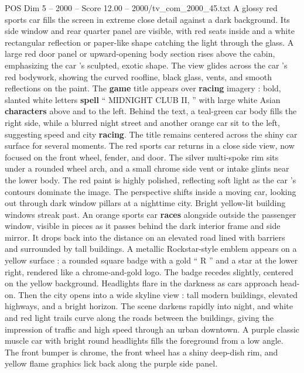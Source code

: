 \begin{textsample}{POS Dim 5 – 2000 – Score 12.00 – 2000/tv\_com\_2000\_45.txt}  \label{ex:f5_pos_022}
A glossy red sports car fills the screen in extreme close detail against a dark background.
Its side window and rear quarter panel are visible, with red seats inside and a white rectangular reflection or paper-like shape catching the light through the glass.
A large red door panel or upward-opening body section rises above the cabin, emphasizing the car ’s sculpted, exotic shape.
The view glides across the car ’s red bodywork, showing the curved roofline, black glass, vents, and smooth reflections on the paint.
The \textbf{game} title appears over \textbf{racing} imagery : bold, slanted white letters \textbf{spell} “ MIDNIGHT CLUB II, ” with large white Asian \textbf{characters} above and to the left.
Behind the text, a teal-green car body fills the right side, while a blurred night street and another orange car sit to the left, suggesting speed and city \textbf{racing}.
The title remains centered across the shiny car surface for several moments.
The red sports car returns in a close side view, now focused on the front wheel, fender, and door.
The silver multi-spoke rim sits under a rounded wheel arch, and a small chrome side vent or intake glints near the lower body.
The red paint is highly polished, reflecting soft light as the car ’s contours dominate the image.
The perspective shifts inside a moving car, looking out through dark window pillars at a nighttime city.
Bright yellow-lit building windows streak past.
An orange sports car \textbf{races} alongside outside the passenger window, visible in pieces as it passes behind the dark interior frame and side mirror.
It drops back into the distance on an elevated road lined with barriers and surrounded by tall buildings.
A metallic Rockstar-style emblem appears on a yellow surface : a rounded square badge with a gold “ R ” and a star at the lower right, rendered like a chrome-and-gold logo.
The badge recedes slightly, centered on the yellow background.
Headlights flare in the darkness as cars approach head-on.
Then the city opens into a wide skyline view : tall modern buildings, elevated highways, and a bright horizon.
The scene darkens rapidly into night, and white and red light trails curve along the roads between the buildings, giving the impression of traffic and high speed through an urban downtown.
A purple classic muscle car with bright round headlights fills the foreground from a low angle.
The front bumper is chrome, the front wheel has a shiny deep-dish rim, and yellow flame graphics lick back along the purple side panel.

\end{textsample}
